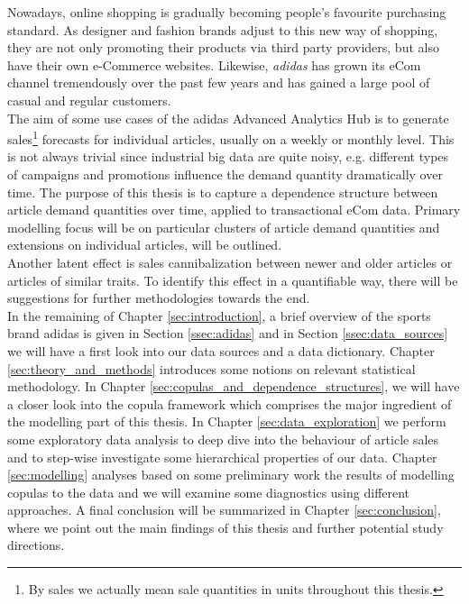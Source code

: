 

Nowadays, online shopping is gradually becoming people's favourite purchasing standard. As designer and fashion brands adjust to this new way of shopping, they are not only promoting their products via third party 	providers, but also have their own e-Commerce websites. Likewise, \textit{adidas} has grown its eCom channel tremendously over the past few years and has gained a large pool of casual and regular customers.\\

The aim of some use cases of the adidas Advanced Analytics Hub is to generate sales\footnote{By sales we actually mean sale quantities in units throughout this thesis.} forecasts for individual articles, usually on a weekly or monthly level. This is not always trivial since industrial big data are quite noisy, e.g. different types of campaigns and promotions influence the demand quantity dramatically over time. The purpose of this thesis is to capture a dependence structure between article demand quantities over time, applied to transactional eCom data. Primary modelling focus will be on particular clusters of article demand quantities and extensions on individual articles, will be outlined. \\

Another latent effect is sales cannibalization between newer and older articles or articles of similar traits. To identify this effect in a quantifiable way, there will be suggestions for further methodologies towards the end. \\

In the remaining of Chapter \ref{sec:introduction}, a brief overview of the sports brand adidas is given in Section \ref{ssec:adidas} and in Section \ref{ssec:data_sources} we will have a first look into our data sources and a data dictionary. Chapter \ref{sec:theory_and_methods} introduces some notions on relevant statistical methodology. In Chapter \ref{sec:copulas_and_dependence_structures}, we will have a closer look into the copula framework which comprises the major ingredient of the modelling part of this thesis. In Chapter \ref{sec:data_exploration} we perform some exploratory data analysis to deep dive into the behaviour of article sales and to step-wise investigate some hierarchical properties of our data.  Chapter \ref{sec:modelling} analyses based on some preliminary work the results of modelling copulas to the data and we will examine some diagnostics using different approaches. A final conclusion will be summarized in Chapter \ref{sec:conclusion}, where we point out the main findings of this thesis and further potential study directions.




